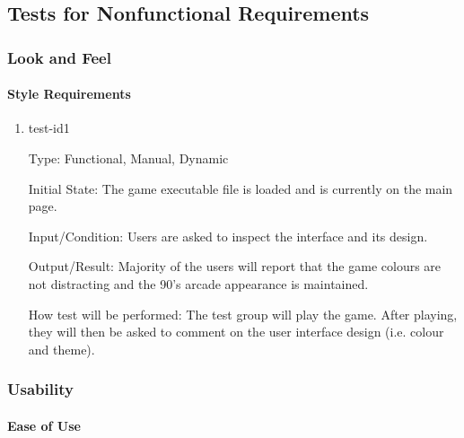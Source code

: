 \documentclass[12pt, titlepage]{article}
\begin{document}
	
	\subsection{Tests for Nonfunctional Requirements}
	
	\subsubsection{Look and Feel}
	
	\paragraph{Style Requirements}
	
	\begin{enumerate}
		
		
		\item{test-id1\\}
		
		Type: Functional, Manual, Dynamic 
		
		Initial State: The game executable file is loaded and is currently on the main page.
		
		Input/Condition: Users are asked to inspect the interface and its design.
		
		Output/Result: Majority of the users  will report that the game colours are not distracting and the 90's arcade appearance is maintained.
		
		How test will be performed: The test group will play the game. After playing, they will then be asked to comment on the user interface design (i.e. colour and theme).
		
	\end{enumerate}
	
	
	\subsubsection{Usability}
	
	\paragraph{Ease of Use}
	
\end{document}
